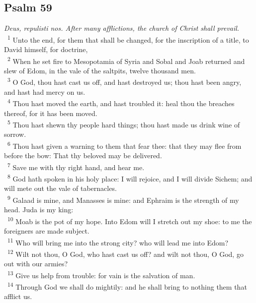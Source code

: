 \documentclass[a5paper,12pt]{article}
\begin{document}
\begin{multicols*}{2}
\section{Psalm 59}
\label{sec:orga7bc90c}
\emph{Deus, repulisti nos. After many afflictions, the church of Christ shall prevail.}\\

~\textsuperscript{1} Unto the end, for them that shall be changed, for the inscription of a title, to David himself, for doctrine,\\
~\textsuperscript{2} When he set fire to Mesopotamia of Syria and Sobal and Joab returned and slew of Edom, in the vale of the saltpits, twelve thousand men.\\
~\textsuperscript{3} O God, thou hast cast us off, and hast destroyed us; thou hast been angry, and hast had mercy on us.\\
~\textsuperscript{4} Thou hast moved the earth, and hast troubled it: heal thou the breaches thereof, for it has been moved.\\
~\textsuperscript{5} Thou hast shewn thy people hard things; thou hast made us drink wine of sorrow.\\
~\textsuperscript{6} Thou hast given a warning to them that fear thee: that they may flee from before the bow: That thy beloved may be delivered.\\
~\textsuperscript{7} Save me with thy right hand, and hear me.\\
~\textsuperscript{8} God hath spoken in his holy place: I will rejoice, and I will divide Sichem; and will mete out the vale of tabernacles.\\
~\textsuperscript{9} Galaad is mine, and Manasses is mine: and Ephraim is the strength of my head. Juda is my king:\\
~\textsuperscript{10} Moab is the pot of my hope. Into Edom will I stretch out my shoe: to me the foreigners are made subject.\\
~\textsuperscript{11} Who will bring me into the strong city? who will lead me into Edom?\\
~\textsuperscript{12} Wilt not thou, O God, who hast cast us off? and wilt not thou, O God, go out with our armies?\\
~\textsuperscript{13} Give us help from trouble: for vain is the salvation of man.\\
~\textsuperscript{14} Through God we shall do mightily: and he shall bring to nothing them that afflict us.\\


\end{multicols*}
\end{document}

